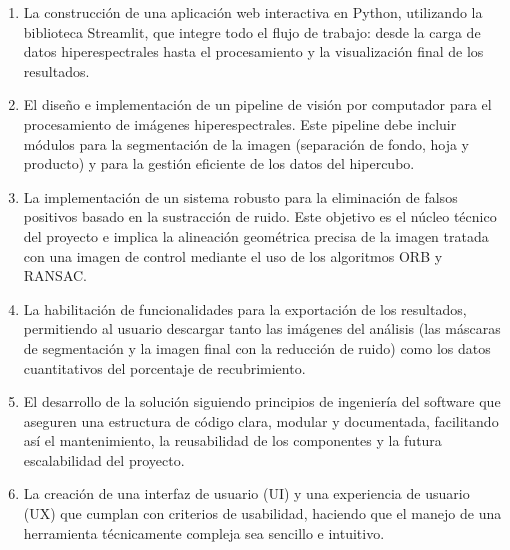 \begin{enumerate}
    \item La construcción de una aplicación web interactiva en Python, utilizando la biblioteca Streamlit, que integre todo el flujo de trabajo: desde la carga de datos hiperespectrales hasta el procesamiento y la visualización final de los resultados.
    \item El diseño e implementación de un pipeline de visión por computador para el procesamiento de imágenes hiperespectrales. Este pipeline debe incluir módulos para la segmentación de la imagen (separación de fondo, hoja y producto) y para la gestión eficiente de los datos del hipercubo.
    \item La implementación de un sistema robusto para la eliminación de falsos positivos basado en la sustracción de ruido. Este objetivo es el núcleo técnico del proyecto e implica la alineación geométrica precisa de la imagen tratada con una imagen de control mediante el uso de los algoritmos ORB y RANSAC.
    \item La habilitación de funcionalidades para la exportación de los resultados, permitiendo al usuario descargar tanto las imágenes del análisis (las máscaras de segmentación y la imagen final con la reducción de ruido) como los datos cuantitativos del porcentaje de recubrimiento.
    \item El desarrollo de la solución siguiendo principios de ingeniería del software que aseguren una estructura de código clara, modular y documentada, facilitando así el mantenimiento, la reusabilidad de los componentes y la futura escalabilidad del proyecto.
    \item La creación de una interfaz de usuario (UI) y una experiencia de usuario (UX) que cumplan con criterios de usabilidad, haciendo que el manejo de una herramienta técnicamente compleja sea sencillo e intuitivo. 

\end{enumerate}

